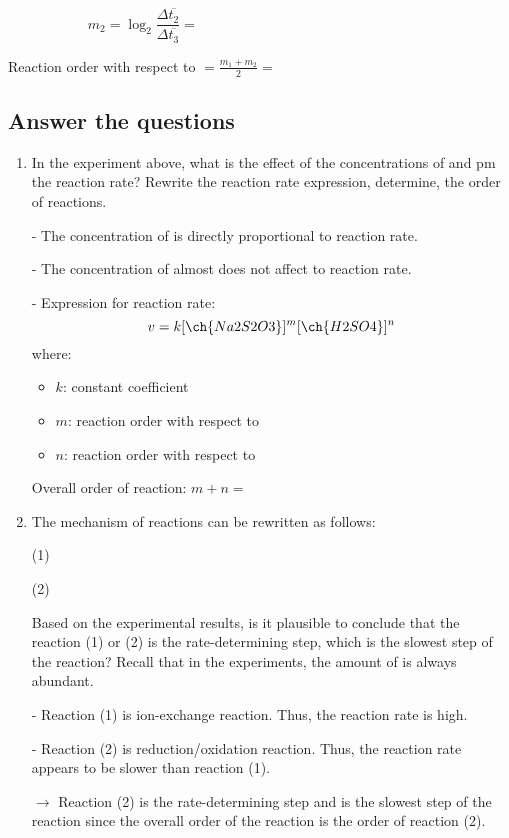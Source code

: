 \[m_2 = \log_2 \frac{\Delta \overline{t_2}}{\Delta \overline{t_3}}= \hspace{7cm}\]

Reaction order with respect to  $\displaystyle = \frac{m_1+m_2}{2} =$

\subsection{Answer the questions}

\begin{enumerate}
	\item In the experiment above, what is the effect of the concentrations of  and  pm the reaction rate? Rewrite the reaction rate expression, determine, the order of reactions.
	
	- The concentration of  is directly proportional to reaction rate.
	
	- The concentration of  almost does not affect to reaction rate.
	
	- Expression for reaction rate: \[v=k[\ch{Na2S2O3}]^m[\ch{H2SO4}]^n\]
	where:
	\begin{itemize}[label=]
		\item $k$: constant coefficient
		\item $m$: reaction order with respect to 
		\item $n$: reaction order with respect to 
	\end{itemize}
	Overall order of reaction: $m+n=$
	
	\item The mechanism of reactions can be rewritten as follows:
	
	 (1)
	
	 (2)
	
	Based on the experimental results, is it plausible to conclude that the reaction (1) or (2) is the rate-determining step, which is the slowest step of the reaction? Recall that in the experiments, the amount of  is always abundant.
	
	- Reaction (1) is ion-exchange reaction. Thus, the reaction rate is high.
	
	- Reaction (2) is reduction/oxidation reaction. Thus, the reaction rate appears to be slower than reaction (1).
	
	$\rightarrow$ Reaction (2) is the rate-determining step and is the slowest step of the reaction since the overall order of the reaction is the order of reaction (2).
	

\end{enumerate}
